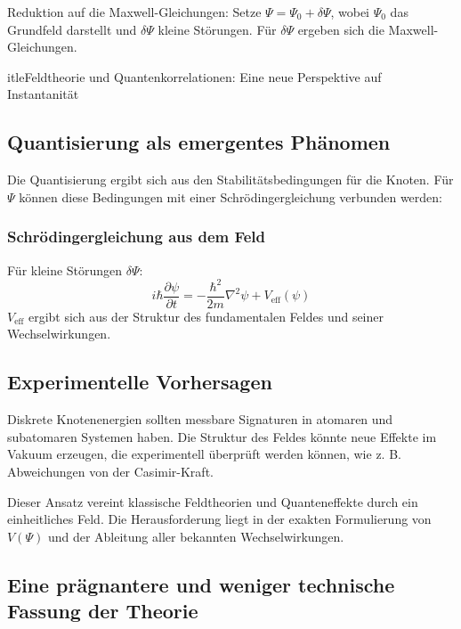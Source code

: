 \documentclass[12pt,a4paper]{article}
\begin{document}
	Reduktion auf die Maxwell-Gleichungen:
	Setze $\Psi = \Psi_0 + \delta\Psi$, wobei $\Psi_0$ das Grundfeld darstellt und $\delta\Psi$ kleine Störungen. Für $\delta\Psi$ ergeben sich die Maxwell-Gleichungen.
	
	
	
		itle{Feldtheorie und Quantenkorrelationen: Eine neue Perspektive auf Instantanität}
	
	
	\maketitle
	
	\subsection{Quantisierung als emergentes Phänomen}
	Die Quantisierung ergibt sich aus den Stabilitätsbedingungen für die Knoten. Für $\Psi$ können diese Bedingungen mit einer Schrödingergleichung verbunden werden:
	
	\subsubsection{Schrödingergleichung aus dem Feld}
	Für kleine Störungen $\delta\Psi$:
	\begin{equation}
		i \hbar \frac{\partial \psi}{\partial t} = -\frac{\hbar^2}{2m} \nabla^2 \psi + V_{\text{eff}}(\psi)
	\end{equation}
	$V_{\text{eff}}$ ergibt sich aus der Struktur des fundamentalen Feldes und seiner Wechselwirkungen.
	
	\subsection{Experimentelle Vorhersagen}
	Diskrete Knotenenergien sollten messbare Signaturen in atomaren und subatomaren Systemen haben. Die Struktur des Feldes könnte neue Effekte im Vakuum erzeugen, die experimentell überprüft werden können, wie z. B. Abweichungen von der Casimir-Kraft.
	
	Dieser Ansatz vereint klassische Feldtheorien und Quanteneffekte durch ein einheitliches Feld. Die Herausforderung liegt in der exakten Formulierung von $V(\Psi)$ und der Ableitung aller bekannten Wechselwirkungen.
	
	\subsection{Eine prägnantere und weniger technische Fassung der Theorie}
	
\end{document}
